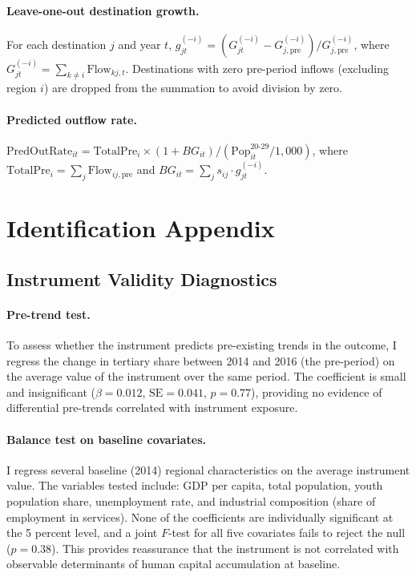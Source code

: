 \documentclass[12pt]{article}
\begin{document}
\paragraph{Leave-one-out destination growth.} For each destination $j$ and year $t$, $g_{jt}^{(-i)} = (G_{jt}^{(-i)} - G_{j,\text{pre}}^{(-i)}) / G_{j,\text{pre}}^{(-i)}$, where $G_{jt}^{(-i)} = \sum_{k \neq i} \text{Flow}_{kj,t}$. Destinations with zero pre-period inflows (excluding region $i$) are dropped from the summation to avoid division by zero.

\paragraph{Predicted outflow rate.} $\text{PredOutRate}_{it} = \text{TotalPre}_i \times (1 + BG_{it}) / (\text{Pop}^{20\text{-}29}_{it} / 1{,}000)$, where $\text{TotalPre}_i = \sum_j \text{Flow}_{ij,\text{pre}}$ and $BG_{it} = \sum_j s_{ij} \cdot g_{jt}^{(-i)}$.


\section{Identification Appendix}
\label{sec:app_identification}

\subsection{Instrument Validity Diagnostics}

\paragraph{Pre-trend test.} To assess whether the instrument predicts pre-existing trends in the outcome, I regress the change in tertiary share between 2014 and 2016 (the pre-period) on the average value of the instrument over the same period. The coefficient is small and insignificant ($\beta = 0.012$, $\text{SE} = 0.041$, $p = 0.77$), providing no evidence of differential pre-trends correlated with instrument exposure.

\paragraph{Balance test on baseline covariates.} I regress several baseline (2014) regional characteristics on the average instrument value. The variables tested include: GDP per capita, total population, youth population share, unemployment rate, and industrial composition (share of employment in services). None of the coefficients are individually significant at the 5 percent level, and a joint $F$-test for all five covariates fails to reject the null ($p = 0.38$). This provides reassurance that the instrument is not correlated with observable determinants of human capital accumulation at baseline.
\end{document}
